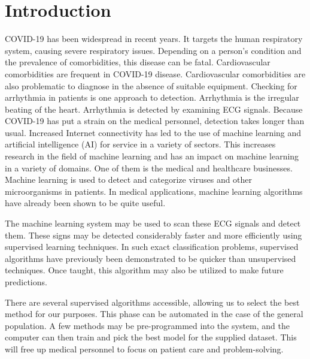 \section{Introduction} \label{sec:introduction}

COVID-19 has been widespread in recent years. It targets the human respiratory system, causing severe respiratory issues. Depending on a person's condition and the prevalence of comorbidities, this disease can be fatal. Cardiovascular comorbidities are frequent in COVID-19 disease. Cardiovascular comorbidities are also problematic to diagnose in the absence of suitable equipment. Checking for arrhythmia in patients is one approach to detection. Arrhythmia is the irregular beating of the heart. Arrhythmia is detected by examining ECG signals. Because COVID-19 has put a strain on the medical personnel, detection takes longer than usual. Increased Internet connectivity has led to the use of machine learning and artificial intelligence (AI) for service in a variety of sectors. This increases research in the field of machine learning and has an impact on machine learning in a variety of domains. One of them is the medical and healthcare businesses. Machine learning is used to detect and categorize viruses and other microorganisms in patients. In medical applications, machine learning algorithms have already been shown to be quite useful.

The machine learning system may be used to scan these ECG signals and detect them. These signs may be detected considerably faster and more efficiently using supervised learning techniques. In such exact classification problems, supervised algorithms have previously been demonstrated to be quicker than unsupervised techniques. Once taught, this algorithm may also be utilized to make future predictions.

There are several supervised algorithms accessible, allowing us to select the best method for our purposes. This phase can be automated in the case of the general population. A few methods may be pre-programmed into the system, and the computer can then train and pick the best model for the supplied dataset. This will free up medical personnel to focus on patient care and problem-solving.
